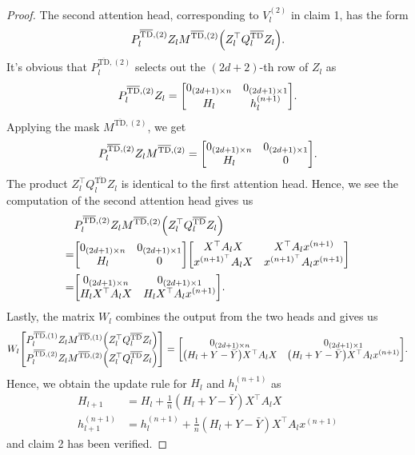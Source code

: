 \documentclass{article}
\newcommand{\bartd}{\overline{\text{TD}}}
\begin{document}
\begin{proof}
    The second attention head, corresponding to $V_l^{(2)}$ in claim 1, has the form
    \begin{align}
        P_l^{\bartd, (2)} Z_l M^{\bartd, (2)} \qty(Z_l^\top Q_l^{\bartd} Z_l).
    \end{align}
    It's obvious that $P_l^{\bartd, (2)}$ selects out the $(2d+2)$-th row of $Z_l$ as
    \begin{align}
        P_l^{\bartd, (2)} Z_l = \mqty[0_{(2d+1)\times n} & 0_{(2d+1)\times 1}\\
                                      H_l & h_l^{(n+1)}].
    \end{align}     
    Applying the mask $M^{\bartd, (2)}$, we get
    \begin{align}
        P_l^{\bartd, (2)} Z_l M^{\bartd, (2)} = \mqty[0_{(2d+1)\times n} & 0_{(2d+1)\times 1}\\
                                                      H_l & 0].
    \end{align}
    The product $Z_l^\top Q_l^{\bartd} Z_l$ is identical to the first attention head.
    Hence, we see the computation of the second attention head gives us
    \begin{align}
        &P_l^{\bartd, (2)} Z_l M^{\bartd, (2)} \qty(Z_l^\top Q_l^{\bartd} Z_l)\\
        =& \mqty[0_{(2d+1)\times n} & 0_{(2d+1)\times 1}\\
                 H_l & 0]
            \mqty[X^\top A_l X & X^\top A_l x^{(n+1)}\\
                  x^{(n+1)^\top} A_l X & x^{(n+1)^\top} A_l x^{(n+1)}]\\
        =& \mqty[0_{(2d+1)\times n} & 0_{(2d+1)\times 1}\\
                 H_l X^\top A_l X & H_l X^\top A_l x^{(n+1)}].
    \end{align}
    Lastly, the matrix $W_l$ combines the output from the two heads and gives us
    \begin{align}
        W_l \mqty[P_l^{\bartd, (1)} Z_l M^{\bartd, (1)} \qty(Z_l^\top Q_l^{\bartd} Z_l)\\
                  P_l^{\bartd, (2)} Z_l M^{\bartd, (2)} \qty(Z_l^\top Q_l^{\bartd} Z_l)]
        = \mqty[0_{(2d+1)\times n} & 0_{(2d+1)\times 1}\\
                \qty(H_l + Y - \bar{Y})X^\top A_l X & \qty(H_l + Y - \bar{Y}) X^\top A_l x^{(n+1)}].
    \end{align}
    Hence, we obtain the update rule for $H_l$ and $h_l^{(n+1)}$ as
    \begin{align}
         H_{l+1} &= H_l + \frac{1}{n} (H_l + Y - \bar{Y}) X^\top A_l X\\
        h_{l+1}^{(n+1)} &= h_l^{(n+1)} + \frac{1}{n} (H_l + Y - \bar{Y}) X^\top A_l x^{(n+1)}
    \end{align}
    and claim 2 has been verified.


\end{proof}
\end{document}
